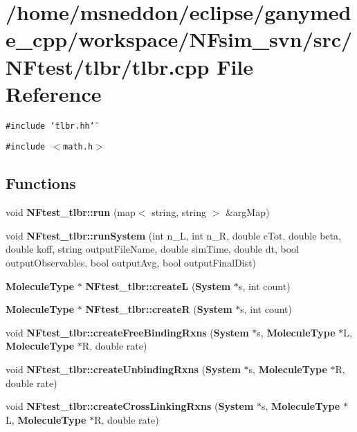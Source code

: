 \section{/home/msneddon/eclipse/ganymede\_\-cpp/workspace/NFsim\_\-svn/src/NFtest/tlbr/tlbr.cpp File Reference}
\label{tlbr_8cpp}


{\tt \#include \char`\"{}tlbr.hh\char`\"{}}\par
{\tt \#include $<$math.h$>$}\par
\subsection*{Functions}
\begin{CompactItemize}
\item 
void {\bf NFtest\_\-tlbr::run} (map$<$ string, string $>$ \&argMap)
\item 
void {\bf NFtest\_\-tlbr::runSystem} (int n\_\-L, int n\_\-R, double cTot, double beta, double koff, string outputFileName, double simTime, double dt, bool outputObservables, bool outputAvg, bool outputFinalDist)
\item 
{\bf MoleculeType} $\ast$ {\bf NFtest\_\-tlbr::createL} ({\bf System} $\ast$s, int count)
\item 
{\bf MoleculeType} $\ast$ {\bf NFtest\_\-tlbr::createR} ({\bf System} $\ast$s, int count)
\item 
void {\bf NFtest\_\-tlbr::createFreeBindingRxns} ({\bf System} $\ast$s, {\bf MoleculeType} $\ast$L, {\bf MoleculeType} $\ast$R, double rate)
\item 
void {\bf NFtest\_\-tlbr::createUnbindingRxns} ({\bf System} $\ast$s, {\bf MoleculeType} $\ast$R, double rate)
\item 
void {\bf NFtest\_\-tlbr::createCrossLinkingRxns} ({\bf System} $\ast$s, {\bf MoleculeType} $\ast$L, {\bf MoleculeType} $\ast$R, double rate)
\end{CompactItemize}
